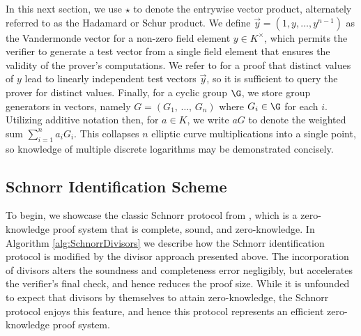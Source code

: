 \documentclass[11pt,letterpaper]{article}
\theoremstyle{definition}
\newcommand{\6}{\mathbf}
\newcommand{\7}{\mathcal}
\newcommand{\lsamp}{\xleftarrow{\$}}
\begin{document}
In this next section, we use $\star$ to denote the entrywise vector product, alternately referred to as the Hadamard or Schur product. 
We define $\vec{y} = (1, y, \dots, y^{n-1})$ as the Vandermonde vector for a non-zero field element $y \in K^\times$, which permits the verifier to generate a test vector from a single field element that ensures the validity of the prover's computations.  
We refer to \cite{HammR} for a proof that distinct values of $y$ lead to linearly independent test vectors $\vec{y}$, so it is sufficient to query the prover for distinct values.
Finally, for a cyclic group $\G$, we store group generators in vectors, namely $G = (G_1, \, \dots, \, G_n)$ where $G_i \in \G$ for each $i$.
Utilizing additive notation then, for $a \in K$, we write $a G$ to denote the weighted sum $\sum_{i=1}^n a_i G_i$. 
This collapses $n$ elliptic curve multiplications into a single point, so knowledge of multiple discrete logarithms may be demonstrated concisely.







\subsection{Schnorr Identification Scheme}


To begin, we showcase the classic Schnorr protocol from \cite{Schnorr}, which is a zero-knowledge proof system that is complete, sound, and zero-knowledge.
In Algorithm \ref{alg:SchnorrDivisors} we describe how the Schnorr identification protocol is modified by the divisor approach presented above.
The incorporation of divisors alters the soundness and completeness error negligibly, but accelerates the verifier's final check, and hence reduces the proof size. 
While it is unfounded to expect that divisors by themselves to attain zero-knowledge, the Schnorr protocol enjoys this feature, and hence this protocol represents an efficient zero-knowledge proof system.



\end{document}
